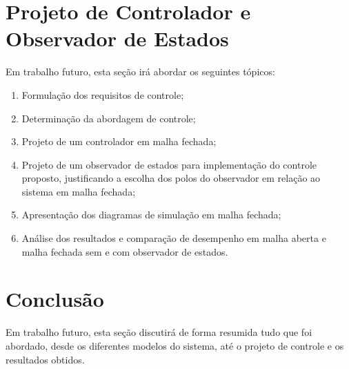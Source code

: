 \documentclass{ppgeesa}
\begin{document}
\section{Projeto de Controlador e Observador de Estados}

Em trabalho futuro, esta seção irá abordar os seguintes tópicos:

\begin{enumerate}
  \item Formulação dos requisitos de controle;
  \item Determinação da abordagem de controle;
  \item Projeto de um controlador em malha fechada;
  \item Projeto de um observador de estados para implementação do controle proposto, justificando a escolha dos polos do observador em relação ao sistema em malha fechada;
  \item Apresentação dos diagramas de simulação em malha fechada;
  \item Análise dos resultados e comparação de desempenho em malha aberta e malha fechada sem e com observador de estados.
\end{enumerate}

\section{Conclusão}

Em trabalho futuro, esta seção discutirá de forma resumida tudo que foi abordado, desde os diferentes modelos do sistema, até o projeto de controle e os resultados obtidos.



\end{document}
